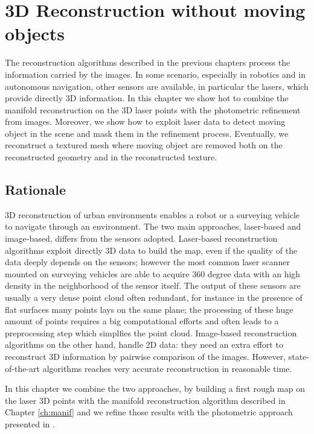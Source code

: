 \chapter{3D Reconstruction without moving objects}
The reconstruction algorithms described in the previous chapters process the information carried by the images. 
In some scenario, especially in robotics and in autonomous navigation, other sensors are available, in particular the lasers, which provide directly 3D information.
In this chapter we show hot to combine the manifold reconstruction on the  3D laser points with the photometric refinement from images.
Moreover, we show how to exploit laser data to detect moving object in the scene and mask them in the refinement process. 
Eventually, we reconstruct a textured mesh where moving object are removed both on the reconstructed geometry and in the reconstructed texture.

\minitoc

\section{Rationale}
3D reconstruction of urban environments enables a robot or a surveying vehicle to navigate through an environment.
The two main approaches, \ie laser-based and image-based, differs from the sensors adopted. 
Laser-based reconstruction algorithms exploit directly 3D data to build the map, even if the quality of the data deeply depends on the sensors; however the most common laser scanner mounted on surveying vehicles are able to acquire 360 degree data with an high density in the neighborhood of the sensor itself. 
The output of these sensors are usually a very dense point cloud often redundant, for instance in the presence of flat surfaces many points lays on the same plane; the processing of these huge amount of points requires a big computational efforts and often leads to a preprocessing step which simplfies the point cloud.
Image-based reconstruction algorithms on the other hand, handle 2D data: they need an extra effort to  reconstruct 3D information by pairwise comparison of the images. However, state-of-the-art algorithms \cite{vu_et_al_2012,li2015detail} reaches very accurate reconstruction in reasonable time.

In this chapter we combine the two approaches, by building a first rough map on the laser 3D points with the manifold reconstruction algorithm described in Chapter \ref{ch:manif} and we refine those results with the photometric approach presented in \cite{vu_et_al_2012,li2015detail}.

